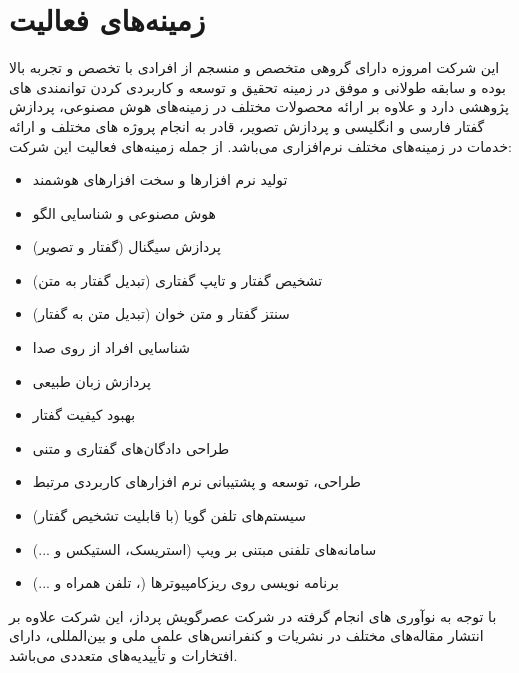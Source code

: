 \section{زمینه‌های فعالیت}

این شرکت امروزه دارای گروهی متخصص و منسجم از افرادی با تخصص و تجربه بالا بوده و سابقه طولانی و موفق در زمینه تحقیق و توسعه و کاربردی کردن توانمندی های پژوهشی دارد و علاوه بر ارائه محصولات مختلف در زمینه‌های هوش مصنوعی، پردازش گفتار فارسی و انگلیسی و پردازش تصویر، قادر به انجام پروژه های مختلف و ارائه خدمات در زمینه‌های مختلف نرم‌افزاری می‌باشد. از جمله زمینه‌های فعالیت این شرکت:
\begin{itemize}
	\item تولید نرم افزارها و سخت افزارهای هوشمند
	\item هوش مصنوعی و شناسایی الگو
	\item پردازش سیگنال (گفتار و تصویر)
	\item تشخیص گفتار و تایپ گفتاری (تبدیل گفتار به متن)
	\item سنتز گفتار و متن خوان (تبدیل متن به گفتار)
	\item شناسایی افراد از روی صدا
	\item پردازش زبان طبیعی
	\item بهبود كیفیت گفتار
	\item طراحی دادگان‌های گفتاری و متنی
	\item طراحی، توسعه و پشتیبانی نرم افزارهای کاربردی مرتبط
	\item سیستم‌های تلفن گویا (با قابلیت تشخیص گفتار)
	\item سامانه‌های تلفنی مبتنی بر ویپ (استریسک، الستیکس و ...)
	\item برنامه نویسی روی ریزکامپیوترها (، تلفن همراه و ...)
\end{itemize}

با توجه به نوآوری های انجام گرفته در شركت عصرگویش پرداز، این شرکت علاوه بر انتشار مقاله‌های مختلف در نشریات و کنفرانس‌های علمی ملی و بین‌المللی، دارای افتخارات و تأییدیه‌های متعددی می‌باشد.